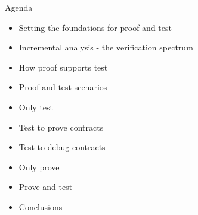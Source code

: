 \documentclass{beamer}
\begin{document}
\begin{frame}[fragile]{Agenda}
  \begin{itemize}
     \item Setting the foundations for proof and test
     \item Incremental analysis - the verification spectrum
     \item How proof supports test
     \item Proof and test scenarios
     \item Only test
     \item Test to prove contracts
     \item Test to debug contracts
     \item Only prove
     \item Prove and test
     \item Conclusions
  \end{itemize}
\end{frame}
\end{document}
